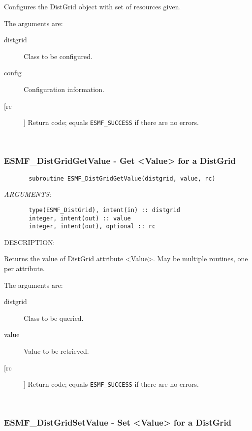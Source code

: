        Configures the DistGrid object with set of resources given.
  
       The arguments are:
       \begin{description}
       \item[distgrid] 
            Class to be configured.
       \item[config]
            Configuration information.         
       \item[[rc]] 
            Return code; equals {\tt ESMF\_SUCCESS} if there are no errors.
       \end{description}
   
 
\mbox{}\hrulefill\ 
 
\subsubsection{ESMF\_DistGridGetValue - Get <Value> for a DistGrid}


 
\begin{verbatim}       subroutine ESMF_DistGridGetValue(distgrid, value, rc)\end{verbatim}{\em ARGUMENTS:}
\begin{verbatim}       type(ESMF_DistGrid), intent(in) :: distgrid
       integer, intent(out) :: value
       integer, intent(out), optional :: rc             
 \end{verbatim}
{\sf DESCRIPTION:\\ }


       Returns the value of DistGrid attribute <Value>.
       May be multiple routines, one per attribute.
  
       The arguments are:
       \begin{description}
       \item[distgrid] 
            Class to be queried.
       \item[value]
            Value to be retrieved.         
       \item[[rc]] 
            Return code; equals {\tt ESMF\_SUCCESS} if there are no errors.
       \end{description}
   
 
\mbox{}\hrulefill\ 
 
\subsubsection{ESMF\_DistGridSetValue - Set <Value> for a DistGrid}


